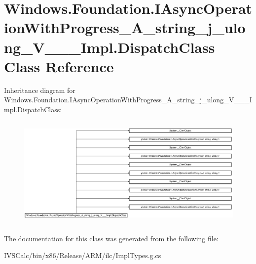 \hypertarget{class_windows_1_1_foundation_1_1_i_async_operation_with_progress___a__string__j__ulong___v_______impl_1_1_dispatch_class}{}\section{Windows.\+Foundation.\+I\+Async\+Operation\+With\+Progress\+\_\+\+A\+\_\+string\+\_\+j\+\_\+ulong\+\_\+\+V\+\_\+\+\_\+\+\_\+\+Impl.\+Dispatch\+Class Class Reference}
\label{class_windows_1_1_foundation_1_1_i_async_operation_with_progress___a__string__j__ulong___v_______impl_1_1_dispatch_class}
Inheritance diagram for Windows.\+Foundation.\+I\+Async\+Operation\+With\+Progress\+\_\+\+A\+\_\+string\+\_\+j\+\_\+ulong\+\_\+\+V\+\_\+\+\_\+\+\_\+\+Impl.\+Dispatch\+Class\+:\begin{figure}[H]
\begin{center}
\leavevmode
\includegraphics[height=5.539568cm]{class_windows_1_1_foundation_1_1_i_async_operation_with_progress___a__string__j__ulong___v_______impl_1_1_dispatch_class}
\end{center}
\end{figure}


The documentation for this class was generated from the following file\+:\begin{DoxyCompactItemize}
\item 
I\+V\+S\+Calc/bin/x86/\+Release/\+A\+R\+M/ilc/Impl\+Types.\+g.\+cs\end{DoxyCompactItemize}
